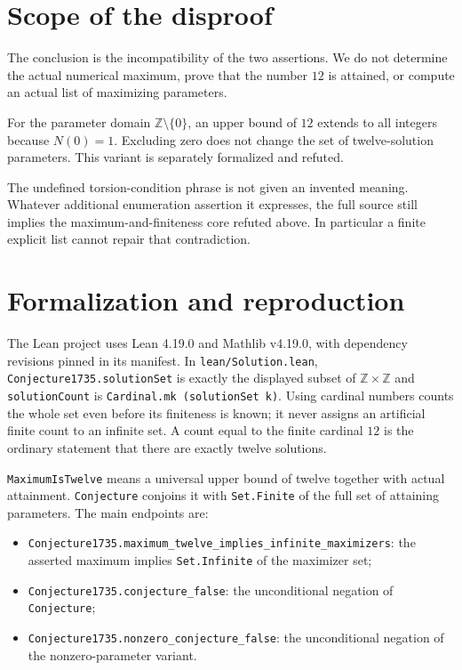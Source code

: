 \documentclass[11pt]{article}
\newcommand{\Z}{\mathbb Z}
\begin{document}
\newpage
\section{Scope of the disproof}

The conclusion is the incompatibility of the two assertions. We do not determine
the actual numerical maximum, prove that the number $12$ is attained, or compute
an actual list of maximizing parameters.

For the parameter domain $\Z\setminus\{0\}$, an upper bound of $12$ extends
to all integers because $N(0)=1$. Excluding zero does not change the set of
twelve-solution parameters. This variant is separately formalized and refuted.

The undefined torsion-condition phrase is not given an invented meaning.
Whatever additional enumeration assertion it expresses, the full source still
implies the maximum-and-finiteness core refuted above. In particular a finite
explicit list cannot repair that contradiction.

\section{Formalization and reproduction}

The Lean project uses Lean 4.19.0 and Mathlib v4.19.0, with dependency revisions
pinned in its manifest. In \nolinkurl{lean/Solution.lean},
\nolinkurl{Conjecture1735.solutionSet} is exactly the displayed subset of
$\Z\times\Z$ and \nolinkurl{solutionCount} is
\nolinkurl{Cardinal.mk (solutionSet k)}. Using cardinal numbers counts the whole
set even before its finiteness is known; it never assigns an artificial finite
count to an infinite set. A count equal to the finite cardinal $12$ is the
ordinary statement that there are exactly twelve solutions.

\nolinkurl{MaximumIsTwelve} means a universal upper bound of twelve together
with actual attainment. \nolinkurl{Conjecture} conjoins it with
\nolinkurl{Set.Finite} of the full set of attaining parameters. The main endpoints
are:
\begin{itemize}
 \item \nolinkurl{Conjecture1735.maximum_twelve_implies_infinite_maximizers}:
 the asserted maximum implies \nolinkurl{Set.Infinite} of the maximizer set;
 \item \nolinkurl{Conjecture1735.conjecture_false}:
 the unconditional negation of \nolinkurl{Conjecture};
 \item \nolinkurl{Conjecture1735.nonzero_conjecture_false}:
 the unconditional negation of the nonzero-parameter variant.
\end{itemize}
\end{document}
